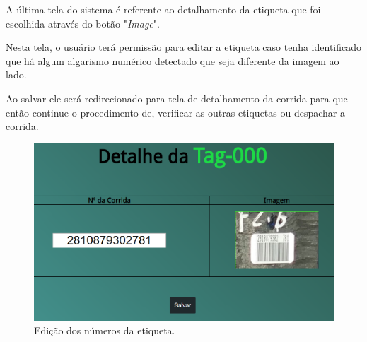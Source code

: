 A última tela do sistema é referente ao detalhamento da etiqueta que foi escolhida através do botão "\textit{Image}".

Nesta tela, o usuário terá permissão para editar a etiqueta caso tenha identificado que há algum algarismo numérico detectado que seja diferente da imagem ao lado.

Ao salvar ele será redirecionado para tela de detalhamento da corrida para que então continue o procedimento de, verificar as outras etiquetas ou despachar a corrida.

\begin{figure}[H]
	\centering
	\includegraphics[width=0.8\linewidth]{figuras/WebService/Screens/detail_tag.png}
	\caption{Edição dos números da etiqueta.}
	\label{fig:detail_tag}
\end{figure}